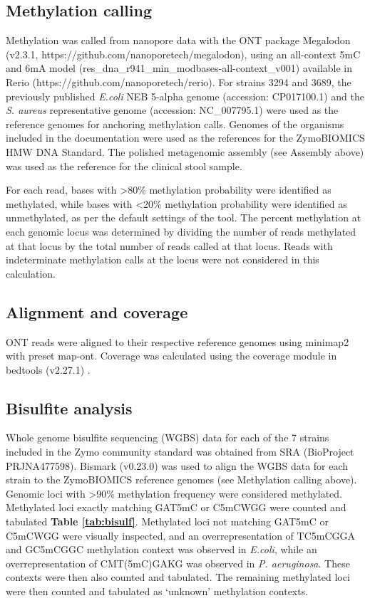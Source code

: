 \subsection{Methylation calling}
\label{sec:methods}

Methylation was called from nanopore data with the ONT package Megalodon (v2.3.1, https://github.com/nanoporetech/megalodon), using an all-context 5mC and 6mA model (res\_dna\_r941\_min\_modbases-all-context\_v001) available in Rerio (https://github.com/nanoporetech/rerio). For strains 3294 and 3689, the previously published \textit{E.coli} NEB 5-alpha genome (accession: CP017100.1) and the \textit{S. aureus} representative genome (accession: NC\_007795.1) were used as the reference genomes for anchoring methylation calls. Genomes of the organisms included in the documentation were used as the references for the ZymoBIOMICS HMW DNA Standard. The polished metagenomic assembly (see Assembly above) was used as the reference for the clinical stool sample.

For each read, bases with >80\% methylation probability were identified as methylated, while bases with <20\% methylation probability were identified as unmethylated, as per the default settings of the tool. The percent methylation at each genomic locus was determined by dividing the number of reads methylated at that locus by the total number of reads called at that locus. Reads with indeterminate methylation calls at the locus were not considered in this calculation.

\subsection{Alignment and coverage}
\label{sec:methods}

ONT reads were aligned to their respective reference genomes using minimap2 with preset map-ont. Coverage was calculated using the coverage module in bedtools (v2.27.1) \citep{Quinlan2010-lu}.

\subsection{Bisulfite analysis}
\label{sec:methods}

Whole genome bisulfite sequencing (WGBS) data for each of the 7 strains included in the Zymo community standard was obtained from SRA (BioProject PRJNA477598). Bismark (v0.23.0) \citep{Krueger2011-cu} was used to align the WGBS data for each strain to the ZymoBIOMICS reference genomes (see Methylation calling above). Genomic loci with >90\% methylation frequency were considered methylated. Methylated loci exactly matching GAT5mC or C5mCWGG were counted and tabulated {\bf Table \ref{tab:bisulf}}. Methylated loci not matching GAT5mC or C5mCWGG were visually inspected, and an overrepresentation of TC5mCGGA and GC5mCGGC methylation context was observed in \textit{E.coli}, while an overrepresentation of CMT(5mC)GAKG was observed in \textit{P. aeruginosa}. These contexts were then also counted and tabulated. The remaining methylated loci were then counted and tabulated as ‘unknown’ methylation contexts.

